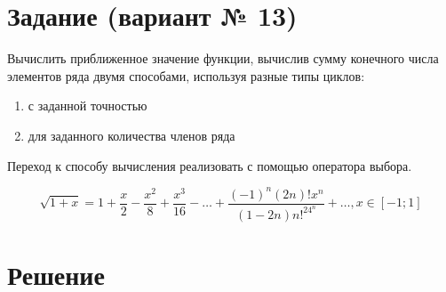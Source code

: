 \documentclass[12pt]{article}
\begin{document}
	\newpage
	
	
	\section*{Задание (вариант № 13)}
	
 	Вычислить приближенное значение функции, вычислив сумму конечного числа элементов ряда двумя способами, используя разные типы циклов:
 	\begin{enumerate}
 		\item с заданной точностью
 		\item для заданного количества членов ряда
 	\end{enumerate}
	Переход к способу вычисления реализовать с помощью оператора выбора.
		
	$$\sqrt{1 + x} = 1 + \frac{x}{2} - \frac{x^2}{8} + \frac{x^3}{16} - \ldots + \frac{(-1)^n(2n)!x^n}{(1 - 2n)n!^24^n} + \ldots, x \in [-1; 1]$$
	
	\newpage
	
	\section*{Решение}
	
\end{document}
